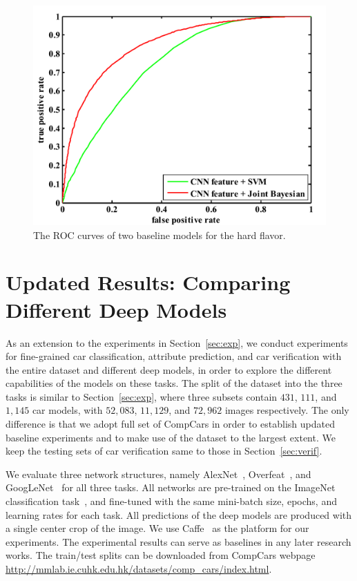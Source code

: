 \documentclass[10pt,twocolumn,letterpaper]{article}
\begin{document}
\begin{figure}[t]\centering
\includegraphics[width=1\linewidth]{roc.pdf}
\caption{The ROC curves of two baseline models for the hard flavor. }
\label{fig:roc}
\end{figure}

\section{Updated Results: Comparing Different Deep Models}\label{sec:updated}
As an extension to the experiments in Section~\ref{sec:exp}, we conduct experiments for fine-grained car classification, attribute prediction, and car verification with the entire dataset and different deep models, in order to explore the different capabilities of the models on these tasks. The split of the dataset into the three tasks is similar to Section~\ref{sec:exp}, where three subsets contain $431$, $111$, and $1,145$ car models, with $52,083$, $11,129$, and $72,962$ images respectively. The only difference is that we adopt full set of CompCars in order to establish updated baseline experiments and to make use of the dataset to the largest extent. We keep the testing sets of car verification same to those in Section~\ref{sec:verif}.

We evaluate three network structures, namely AlexNet~\cite{Krizhevsky12}, Overfeat~\cite{Sermanet13}, and GoogLeNet~\cite{Szegedy14} for all three tasks. All networks are pre-trained on the ImageNet classification task~\cite{Deng09}, and fine-tuned with the same mini-batch size, epochs, and learning rates for each task. All predictions of the deep models are produced with a single center crop of the image. We use Caffe~\cite{Jia14caffe} as the platform for our experiments. The experimental results can serve as baselines in any later research works. The train/test splits can be downloaded from CompCars webpage \url{http://mmlab.ie.cuhk.edu.hk/datasets/comp_cars/index.html}.
\end{document}
